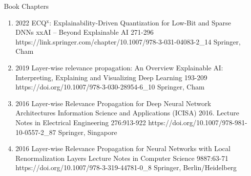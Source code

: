 \documentclass[10pt,a4paper]{article} %
\begin{document}
\headedsection %
{Book Chapters}{}
{
    \begin{enumerate}
        \item {}
                            {2022}
                            {ECQ$^{\textrm{x}}$: Explainability-Driven Quantization for Low-Bit and Sparse DNNs}
                            {xxAI -- Beyond Explainable AI}
                            {271-296}
                            {https://link.springer.com/chapter/10.1007/978-3-031-04083-2_14}
                            {Springer, Cham}

        \item {}
                            {2019}
                            {Layer-wise relevance propagation: An Overview}
                            {Explainable AI: Interpreting, Explaining and Visualizing Deep Learning}
                            {193-209}
                            {https://doi.org/10.1007/978-3-030-28954-6_10}
                            {Springer, Cham}

        \item {}
                            {2016}
                            {Layer-wise Relevance Propagation for Deep Neural Network Architectures}
                            {Information Science and Applications (ICISA) 2016. Lecture Notes in Electrical Engineering}
                            {276:913-922}
                            {https://doi.org/10.1007/978-981-10-0557-2_87}
                            {Springer, Singapore}

        \item {}
                            {2016}
                            {Layer-wise Relevance Propagation for Neural Networks with Local Renormalization Layers}
                            {Lecture Notes in Computer Science}
                            {9887:63-71}
                            {https://doi.org/10.1007/978-3-319-44781-0_8}
                            {Springer, Berlin/Heidelberg}
    \end{enumerate}

}
\end{document}
